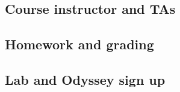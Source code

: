 \documentclass[]{book}
\begin{document}
\hypertarget{course-instructor-and-tas}{%
\subsection{Course instructor and TAs}\label{course-instructor-and-tas}}

\hypertarget{homework-and-grading}{%
\subsection{Homework and grading}\label{homework-and-grading}}

\hypertarget{lab-and-odyssey-sign-up}{%
\subsection{Lab and Odyssey sign up}\label{lab-and-odyssey-sign-up}}
\end{document}
